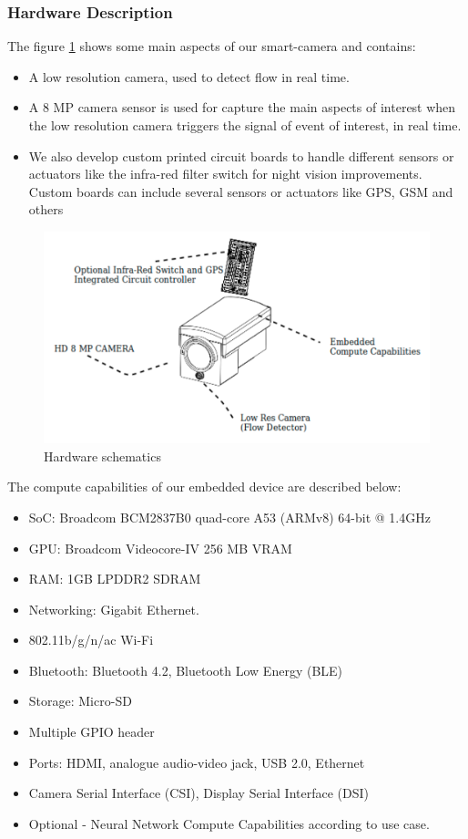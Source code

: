 \subsubsection{Hardware Description}

The figure \ref{fig:hardware_dec} shows some main aspects of our smart-camera and contains:
\begin{itemize}
	\item A low resolution camera, used to detect flow in real time.
	\item A 8 MP camera sensor is used for capture the main aspects of interest when the low resolution camera triggers the signal of event of interest, in real time.
	\item We also develop custom printed circuit boards to handle different sensors or actuators like the infra-red filter switch for night vision improvements. Custom boards can include several sensors or actuators like GPS, GSM and others 
\end{itemize} 

\begin{figure}[b]\centering
	\includegraphics[width=\linewidth]{images/hardware_desc}
	\caption{Hardware schematics}
	\label{fig:hardware_dec}
\end{figure}

The compute capabilities of our embedded device are described below:

\begin{itemize}[noitemsep]

\item SoC: Broadcom BCM2837B0 quad-core A53 (ARMv8) 64-bit @ 1.4GHz
\item GPU: Broadcom Videocore-IV 256 MB VRAM
\item RAM: 1GB LPDDR2 SDRAM
\item Networking: Gigabit Ethernet.
\item 802.11b/g/n/ac Wi-Fi
\item Bluetooth: Bluetooth 4.2, Bluetooth Low Energy (BLE)
\item Storage: Micro-SD
\item Multiple GPIO header
\item Ports: HDMI, analogue audio-video jack, USB 2.0, Ethernet
\item Camera Serial Interface (CSI), Display Serial Interface (DSI)
\item Optional - Neural Network Compute Capabilities according to use case.
\end{itemize}


